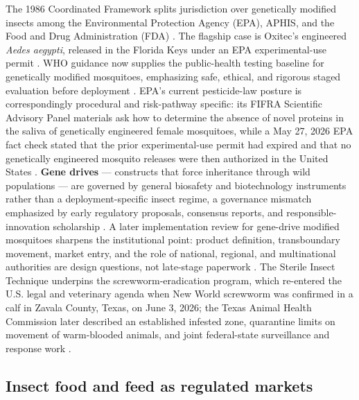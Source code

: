 \documentclass[
  english,
]{article}
\begin{document}
The 1986 Coordinated Framework splits jurisdiction over genetically
modified insects among the Environmental Protection Agency (EPA), APHIS,
and the Food and Drug Administration (FDA) \citep{coordinated1986}. The
flagship case is Oxitec's engineered \emph{Aedes aegypti}, released in
the Florida Keys under an EPA experimental-use permit
\citep{oxitec_epa}. WHO guidance now supplies the public-health testing
baseline for genetically modified mosquitoes, emphasizing safe, ethical,
and rigorous staged evaluation before deployment
\citep{who_gm_mosquitoes2021}. EPA's current pesticide-law posture is
correspondingly procedural and risk-pathway specific: its FIFRA
Scientific Advisory Panel materials ask how to determine the absence of
novel proteins in the saliva of genetically engineered female
mosquitoes, while a May 27, 2026 EPA fact check stated that the prior
experimental-use permit had expired and that no genetically engineered
mosquito releases were then authorized in the United States
\citep{epa_ge_mosquito_sap2025, epa_ge_mosquito_factcheck2026}.
\textbf{Gene drives} --- constructs that force inheritance through wild
populations --- are governed by general biosafety and biotechnology
instruments rather than a deployment-specific insect regime, a
governance mismatch emphasized by early regulatory proposals, consensus
reports, and responsible-innovation scholarship
\citep{oye2014gene_drives, cartagena2000, nasem2016genedrives, fisher2018genedrives}.
A later implementation review for gene-drive modified mosquitoes
sharpens the institutional point: product definition, transboundary
movement, market entry, and the role of national, regional, and
multinational authorities are design questions, not late-stage paperwork
\citep{james2023gene_drive_policy}. The Sterile Insect Technique
underpins the screwworm-eradication program, which re-entered the U.S.
legal and veterinary agenda when New World screwworm was confirmed in a
calf in Zavala County, Texas, on June 3, 2026; the Texas Animal Health
Commission later described an established infested zone, quarantine
limits on movement of warm-blooded animals, and joint federal-state
surveillance and response work \citep{tahc_nws2026}.

\subsection{Insect food and feed as regulated
markets}\label{insect-food-and-feed-as-regulated-markets}
\end{document}
